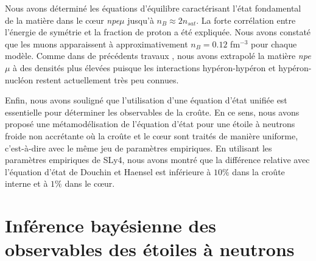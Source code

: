 Nous avons déterminé les équations d'équilibre caractérisant l'état fondamental 
de la matière dans le c\oe ur \textit{npe$\mu$} jusqu'à $n_B\approx 2n_{sat}$. 
La forte corrélation entre l'énergie de symétrie et la fraction de proton a été 
expliquée. 
Nous avons constaté que les muons apparaissent à approximativement 
$n_B = 0.12$ fm$^{-3}$ pour chaque modèle. Comme dans de précédents travaux 
\cite{Wiringa1988,Douchin2001}, nous avons extrapolé la matière 
\textit{npe$\mu$} à des densités plus élevées puisque les interactions 
hypéron-hypéron et hypéron-nucléon restent actuellement très peu connues.

Enfin, nous avons souligné que l'utilisation d'une équation d'état unifiée 
est essentielle pour déterminer les observables de la croûte. En ce sens, nous 
avons proposé une métamodélisation de l'équation d'état pour une étoile à 
neutrons froide non accrétante où la croûte et le c\oe ur sont traités de 
manière uniforme, c'est-à-dire avec le même jeu de paramètres empiriques. 
En utilisant les paramètres empiriques de SLy4, nous avons montré que la 
différence relative avec l'équation d'état de Douchin et Haensel est inférieure 
à $10\%$ dans la croûte interne et à $1\%$ dans le c\oe ur.

\section{Inférence bayésienne des observables des étoiles à neutrons}

